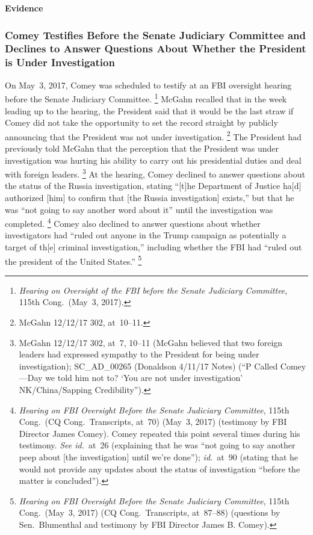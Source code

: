 \begin{center}
\textbf{Evidence}
\end{center}

\subsubsection{Comey Testifies Before the Senate Judiciary Committee and Declines to Answer Questions About Whether the President is Under Investigation}

On May~3, 2017, Comey was scheduled to testify at an FBI oversight hearing before the Senate Judiciary Committee.%
\footnote{\textit{Hearing on Oversight of the FBI before the Senate Judiciary Committee}, 115th Cong.\ (May~3, 2017).}
McGahn recalled that in the week leading up to the hearing, the President said that it would be the last straw if Comey did not take the opportunity to set the record straight by publicly announcing that the President was not under investigation.%
\footnote{McGahn 12/12/17 302, at~10--11.}
The President had previously told McGahn that the perception that the President was under investigation was hurting his ability to carry out his presidential duties and deal with foreign leaders.%
\footnote{McGahn 12/12/17 302, at~7, 10--11 (McGahn believed that two foreign leaders had expressed sympathy to the President for being under investigation);
SC\_AD\_00265 (Donaldson 4/11/17 Notes) (``P Called Comey---Day we told him not to? `You are not under investigation' NK/China/Sapping Credibility'').}
At the hearing, Comey declined to answer questions about the status of the Russia investigation, stating ``[t]he Department of Justice ha[d] authorized [him] to confirm that [the Russia investigation] exists,'' but that he was ``not going to say another word about it'' until the investigation was completed.%
\footnote{\textit{Hearing on FBI Oversight Before the Senate Judiciary Committee}, 115th Cong.\ (CQ Cong.\ Transcripts, at~70) (May~3, 2017) (testimony by FBI Director James Comey).
Comey repeated this point several times during his testimony.
\textit{See id.}~at~26 (explaining that he was ``not going to say another peep about [the investigation] until we're done'');
\textit{id.}~at~90 (stating that he would not provide any updates about the status of investigation ``before the matter is concluded'').}
Comey also declined to answer questions about whether investigators had ``ruled out anyone in the Trump campaign as potentially a target of th[e] criminal investigation,'' including whether the FBI had ``ruled out the president of the United States.''%
\footnote{\textit{Hearing on FBI Oversight Before the Senate Judiciary Committee}, 115th Cong.\ (May~3, 2017) (CQ Cong.\ Transcripts, at~87--88) (questions by Sen.~Blumenthal and testimony by FBI Director James B. Comey).}

